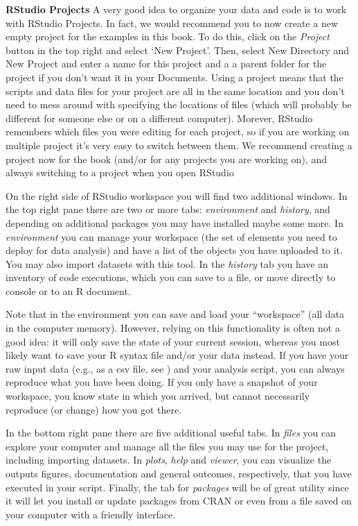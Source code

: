 \begin{feature}
  \textbf{RStudio Projects}
  A very good idea to organize your data and code is to work with RStudio Projects.
  In fact, we would recommend you to now create a new empty project for the examples in this book.
  To do this, click on the \emph{Project} button in the top right and select `New Project'.
  Then, select New Directory and New Project and enter a name for this project
  and a a parent folder for the project if you don't want it in your Documents. 
  Using a project means that the scripts and data files for your project are all in the same location
  and you don't need to mess around with specifying the locations of files
  (which will probably be different for someone else or on a different computer).
  Morever, RStudio remembers which files you were editing for each project,
  so if you are working on multiple project it's very easy to switch between them.
  We recommend creating a project now for the book (and/or for any projects you are working on),
  and always switching to a project when you open RStudio
\end{feature}


On the right side of RStudio workspace you will find two additional
windows. In the top right pane there are two or more tabs:
\emph{environment} and \emph{history}, and depending on additional
packages you may have installed maybe some more.  In
\emph{environment} you can manage your workspace (the set of elements
you need to deploy for data analysis) and have a list of the objects
you have uploaded to it. You may also import datasets with this tool.
In the \emph{history} tab you
have an inventory of code executions, which you can save to a file, or
move directly to console or to an R document.

Note that in the environment you can save and load your ``workspace'' (all data in the computer memory).
However, relying on this functionality is often not a good idea: it
will only save the state of your current session, whereas you most
likely want to save your R syntax file and/or your data instead.
If you have your raw input data (e.g., as a csv file, see )
and your analysis script, you can always
reproduce what you have been doing. If you only have a snapshot of
your workspace, you know state in which you arrived, but cannot
necessarily reproduce (or change) how you got there.

In the bottom right pane there are five additional useful tabs.
In \emph{files} you can explore
your computer and manage all the files you may use for the project,
including importing datasets. In \emph{plots}, \emph{help} and
\emph{viewer}, you can visualize the outputs figures, documentation
and general outcomes, respectively, that you have executed in your
script. Finally, the tab for \emph{packages} will be of great
utility since it will let you install or update packages from CRAN or
even from a file saved on your computer with a friendly interface.

